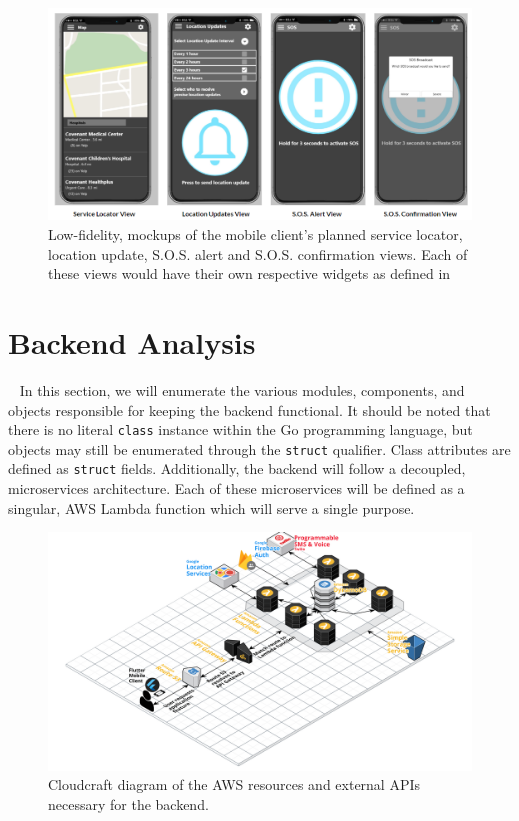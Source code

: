\documentclass[10pt, a4paper]{article}
\begin{document}
\begin{figure}[H]
  \centerline{
  \includegraphics[scale=0.9]{mockups.png}
  }
  \caption{Low-fidelity, mockups of the mobile client's planned service locator, location update, S.O.S. alert and S.O.S. confirmation views. Each of these views would have their own respective widgets as defined in }
\end{figure}


\section{Backend Analysis}
\par ~ In this section, we will enumerate the various modules, components, and objects responsible for keeping the backend functional. It should be noted that there is no literal \texttt{class} instance within the Go programming language, but objects may still be enumerated through the \texttt{struct} qualifier. Class attributes are defined as \texttt{struct} fields. Additionally, the backend will follow a decoupled, microservices architecture. Each of these microservices will be defined as a singular, AWS Lambda function which will serve a single purpose.

\begin{figure}[H]
\begin{center}
\centerline{
	\includegraphics[scale=.15]{EmergenSeek-Backend.PNG}
}
\caption{Cloudcraft \cite{one} diagram of the AWS resources and external APIs necessary for the backend.}
\end{center}	
\end{figure}
\end{document}
